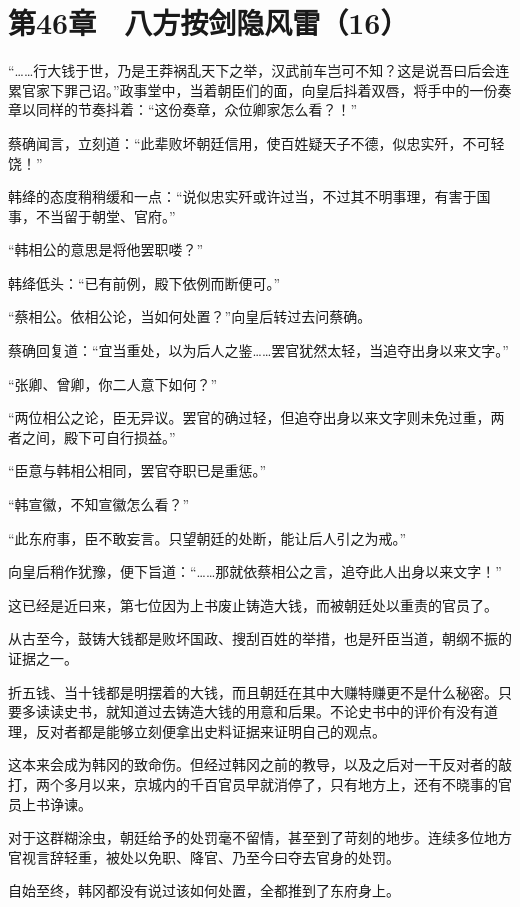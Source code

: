 \section{第46章　八方按剑隐风雷（16）}

“……行大钱于世，乃是王莽祸乱天下之举，汉武前车岂可不知？这是说吾曰后会连累官家下罪己诏。”政事堂中，当着朝臣们的面，向皇后抖着双唇，将手中的一份奏章以同样的节奏抖着：“这份奏章，众位卿家怎么看？！”

蔡确闻言，立刻道：“此辈败坏朝廷信用，使百姓疑天子不德，似忠实歼，不可轻饶！”

韩绛的态度稍稍缓和一点：“说似忠实歼或许过当，不过其不明事理，有害于国事，不当留于朝堂、官府。”

“韩相公的意思是将他罢职喽？”

韩绛低头：“已有前例，殿下依例而断便可。”

“蔡相公。依相公论，当如何处置？”向皇后转过去问蔡确。

蔡确回复道：“宜当重处，以为后人之鉴……罢官犹然太轻，当追夺出身以来文字。”

“张卿、曾卿，你二人意下如何？”

“两位相公之论，臣无异议。罢官的确过轻，但追夺出身以来文字则未免过重，两者之间，殿下可自行损益。”

“臣意与韩相公相同，罢官夺职已是重惩。”

“韩宣徽，不知宣徽怎么看？”

“此东府事，臣不敢妄言。只望朝廷的处断，能让后人引之为戒。”

向皇后稍作犹豫，便下旨道：“……那就依蔡相公之言，追夺此人出身以来文字！”

这已经是近曰来，第七位因为上书废止铸造大钱，而被朝廷处以重责的官员了。

从古至今，鼓铸大钱都是败坏国政、搜刮百姓的举措，也是歼臣当道，朝纲不振的证据之一。

折五钱、当十钱都是明摆着的大钱，而且朝廷在其中大赚特赚更不是什么秘密。只要多读读史书，就知道过去铸造大钱的用意和后果。不论史书中的评价有没有道理，反对者都是能够立刻便拿出史料证据来证明自己的观点。

这本来会成为韩冈的致命伤。但经过韩冈之前的教导，以及之后对一干反对者的敲打，两个多月以来，京城内的千百官员早就消停了，只有地方上，还有不晓事的官员上书诤谏。

对于这群糊涂虫，朝廷给予的处罚毫不留情，甚至到了苛刻的地步。连续多位地方官视言辞轻重，被处以免职、降官、乃至今曰夺去官身的处罚。

自始至终，韩冈都没有说过该如何处置，全都推到了东府身上。

